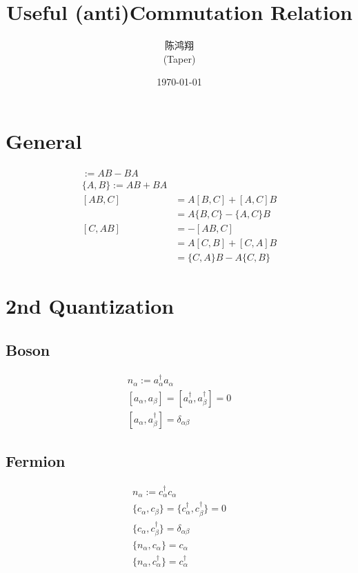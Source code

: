 \documentclass{article}
\title{Useful (anti)Commutation Relation}
\date{\today}
\author{\begin{CJK}{UTF8}{gbsn}
陈鸿翔
\end{CJK}(Taper)}
\numberwithin{equation}{subsection} %
\begin{document}
\maketitle


\tableofcontents

\section{General}
\begin{align}
[A,B]:=AB-BA \\
\{A,B\}:=AB+BA\\
[AB,C] &= A [B,C] + [A,C]B\\
		&= A\{B,C\} - \{A,C\} B\\
[C,AB] &= -[AB,C]\\
		&=A [C,B] + [C,A]B \\
       &=\{C,A\} B - A\{C,B\}
\end{align}

\section{2nd Quantization}

\subsection{Boson}

\begin{align}
n_{\alpha} := a_{\alpha}^{\dagger}a_{\alpha}\\
[a_{\alpha},a_{\beta}]=[a^{\dagger}_{\alpha},a^{\dagger}_{\beta}]=0\\
[a_{\alpha},a^{\dagger}_{\beta}]=\delta_{\alpha\beta}
\end{align}

\subsection{Fermion}
\begin{align}
n_{\alpha} := c_{\alpha}^{\dagger}c_{\alpha}\\
\{c_{\alpha},c_{\beta}\} = \{c_{\alpha}^{\dagger},c_{\beta}^{\dagger}\} = 0\\
\{c_{\alpha},c^{\dagger}_{\beta}\}=\delta_{\alpha\beta} \\
\{n_{\alpha},c_{\alpha}\} = c_{\alpha} \\
\{n_{\alpha},c^{\dagger}_{\alpha}\} = c^{\dagger}_{\alpha}
\end{align}
\end{document}
